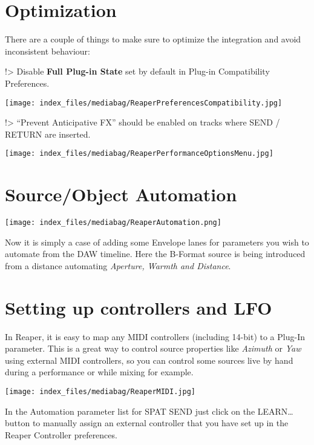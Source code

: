 \documentclass[
  letterpaper,
  DIV=11,
  numbers=noendperiod]{scrreport}
\begin{document}
\hypertarget{optimization}{%
\section{Optimization}\label{optimization}}

There are a couple of things to make sure to optimize the integration
and avoid inconsistent behaviour:

!\textgreater{} Disable \textbf{Full Plug-in State} set by default in
Plug-in Compatibility Preferences.

\texttt{[image: index\_files/mediabag/ReaperPreferencesCompatibility.jpg]}

!\textgreater{} ``Prevent Anticipative FX'' should be enabled on tracks
where SEND / RETURN are inserted.

\texttt{[image: index\_files/mediabag/ReaperPerformanceOptionsMenu.jpg]}

\hypertarget{sourceobject-automation}{%
\section{Source/Object Automation}\label{sourceobject-automation}}

\texttt{[image: index\_files/mediabag/ReaperAutomation.png]}

Now it is simply a case of adding some Envelope lanes for parameters you
wish to automate from the DAW timeline. Here the B-Format source is
being introduced from a distance automating \emph{Aperture, Warmth and
Distance}.

\hypertarget{setting-up-controllers-and-lfo}{%
\section{Setting up controllers and
LFO}\label{setting-up-controllers-and-lfo}}

In Reaper, it is easy to map any MIDI controllers (including 14-bit) to
a Plug-In parameter. This is a great way to control source properties
like \emph{Azimuth} or \emph{Yaw} using external MIDI controllers, so
you can control some sources live by hand during a performance or while
mixing for example.

\texttt{[image: index\_files/mediabag/ReaperMIDI.jpg]}

In the Automation parameter list for SPAT SEND just click on the
LEARN\ldots{} button to manually assign an external controller that you
have set up in the Reaper Controller preferences.
\end{document}
